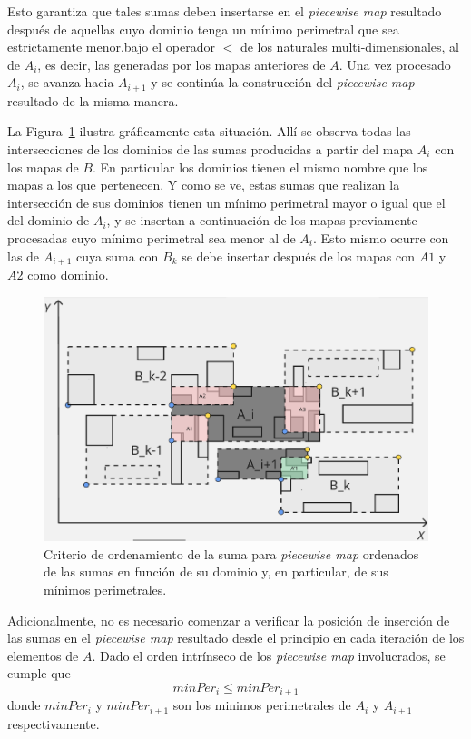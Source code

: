 Esto garantiza que tales sumas deben insertarse en el \textit{piecewise map} resultado después de aquellas cuyo 
 dominio tenga un mínimo perimetral que sea estrictamente menor,bajo el operador $<$ de los naturales multi-dimensionales, al de $A_i$, es decir, las generadas por los mapas anteriores de $A$. Una vez procesado $A_i$, se avanza hacia $A_{i+1}$ y se continúa la construcción del \textit{piecewise map} resultado de la misma manera.

La Figura~\ref{fig:crit-suma} ilustra gráficamente esta situación. Allí se observa todas las intersecciones de los dominios de las sumas producidas a partir del mapa $A_i$ con los mapas de $B$. En particular los dominios tienen el mismo nombre que los mapas a los que pertenecen. Y como se ve, estas sumas que realizan la intersección de sus dominios tienen un mínimo perimetral mayor o igual que el del dominio de $A_i$, y se insertan a continuación de los mapas previamente procesadas cuyo mínimo perimetral sea menor al de $A_i$. Esto mismo ocurre con las de $A_{i+1}$ cuya suma con $B_k$ se debe insertar después de los mapas con $A1$ y  $A2$ como dominio.

\begin{figure}[h]
    \centering
    \includegraphics[width=0.8\linewidth]{figures/optimizaciones pwmap/op simils/crit suma.png}
    \caption{Criterio de ordenamiento de la suma para \textit{piecewise map} ordenados de las sumas en función de su dominio y, en particular, de sus mínimos perimetrales.}
    \label{fig:crit-suma}
\end{figure}

Adicionalmente, no es necesario comenzar a verificar la posición de inserción de las sumas en el \textit{piecewise map} resultado desde el principio en cada iteración de los elementos de $A$. Dado el orden intrínseco de los \textit{piecewise map} involucrados, se cumple que
\[
minPer_{i} \leq minPer_{i+1}
\]
 donde $minPer_i$ y $minPer_{i+1}$ son los minimos perimetrales de $A_i$ y $A_{i+1}$ respectivamente.
 
